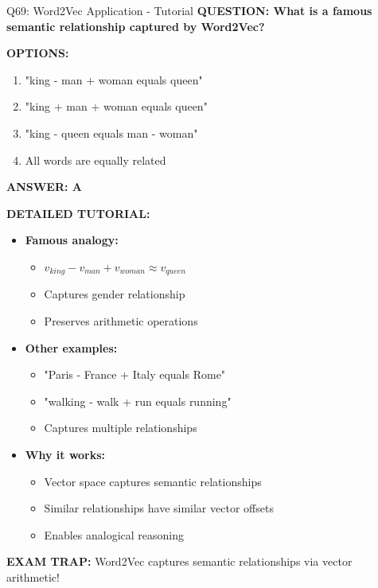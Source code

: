 \documentclass[8pt]{beamer}
\begin{document}
	\begin{frame}{Q69: Word2Vec Application - Tutorial}
		\fontsize{6.5}{7.5}\selectfont
		\textbf{QUESTION: What is a famous semantic relationship captured by Word2Vec?}
		
		\vspace{0.1cm}
		\textbf{OPTIONS:}
		\begin{enumerate}
			\item "king - man + woman equals queen"
			\item "king + man + woman equals queen"
			\item "king - queen equals man - woman"
			\item All words are equally related
		\end{enumerate}
		
		\vspace{0.1cm}
		\textcolor{myblue}{\textbf{ANSWER: A}}
		
		\vspace{0.1cm}
		\textbf{DETAILED TUTORIAL:}
		\begin{itemize}
			\item \textbf{Famous analogy:}
			\begin{itemize}
				\item $v_{king} - v_{man} + v_{woman} \approx v_{queen}$
				\item Captures gender relationship
				\item Preserves arithmetic operations
			\end{itemize}
			\item \textbf{Other examples:}
			\begin{itemize}
				\item "Paris - France + Italy equals Rome"
				\item "walking - walk + run equals running"
				\item Captures multiple relationships
			\end{itemize}
			\item \textbf{Why it works:}
			\begin{itemize}
				\item Vector space captures semantic relationships
				\item Similar relationships have similar vector offsets
				\item Enables analogical reasoning
			\end{itemize}
		\end{itemize}
		
		\textcolor{myred}{\textbf{EXAM TRAP:}} Word2Vec captures \textcolor{myblue}{semantic relationships} via vector arithmetic!
	\end{frame}
	
\end{document}
